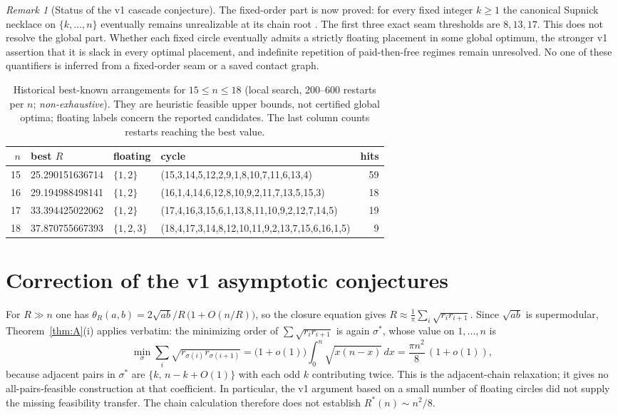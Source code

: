 \documentclass[11pt]{article}
\theoremstyle{definition}
\theoremstyle{remark}
\newtheorem{remark}[theorem]{Remark}
\begin{document}
\begin{remark}[Status of the v1 cascade conjecture]\label{conj:cascade}
The fixed-order part is now proved: for every fixed integer $k\ge1$ the canonical Supnick necklace on $\{k,\dots,n\}$ eventually remains unrealizable at its chain root \cite{fixedseams}. The first three exact seam thresholds are $8,13,17$. This does not resolve the global part. Whether each fixed circle eventually admits a strictly floating placement in some global optimum, the stronger v1 assertion that it is slack in every optimal placement, and indefinite repetition of paid-then-free regimes remain unresolved. No one of these quantifiers is inferred from a fixed-order seam or a saved contact graph.
\end{remark}

\begin{table}[ht]\centering
\caption{Historical best-known arrangements for $15\le n\le18$ (local search, 200--600 restarts per $n$; \emph{non-exhaustive}). They are heuristic feasible upper bounds, not certified global optima; floating labels concern the reported candidates. The last column counts restarts reaching the best value.}
\label{tab:heur}
\small
\begin{tabular}{rlllr}
\toprule
$n$ & best $R$ & floating & cycle & hits \\
\midrule
15 & 25.290151636714 & $\{1,2\}$ & (15,3,14,5,12,2,9,1,8,10,7,11,6,13,4) & 59 \\
16 & 29.194988498141 & $\{1,2\}$ & (16,1,4,14,6,12,8,10,9,2,11,7,13,5,15,3) & 18 \\
17 & 33.394425022062 & $\{1,2\}$ & (17,4,16,3,15,6,1,13,8,11,10,9,2,12,7,14,5) & 19 \\
18 & 37.870755667393 & $\{1,2,3\}$ & (18,4,17,3,14,8,12,10,11,9,2,13,7,15,6,16,1,5) & 9 \\
\bottomrule
\end{tabular}
\end{table}

\section{Correction of the v1 asymptotic conjectures}\label{sec:asymptotics}

For $R\gg n$ one has $\theta_R(a,b)=2\sqrt{ab}/R\,\big(1+O(n/R)\big)$, so the closure equation gives
$R\approx\frac1\pi\sum_i\sqrt{r_ir_{i+1}}$. Since $\sqrt{ab}$ is supermodular, Theorem~\ref{thm:A}(i) applies verbatim: the minimizing order of $\sum\sqrt{r_ir_{i+1}}$ is again $\sigma^\ast$, whose value on $1,\dots,n$ is
\[
\min_\sigma\sum_i\sqrt{r_{\sigma(i)}r_{\sigma(i+1)}}
=\Big(1+o(1)\Big)\int_0^n\sqrt{x(n-x)}\,dx=\frac{\pi n^2}{8}\,(1+o(1)),
\]
because adjacent pairs in $\sigma^\ast$ are $\{k,\,n-k+O(1)\}$ with each odd $k$ contributing twice. This is the adjacent-chain relaxation; it gives no all-pairs-feasible construction at that coefficient. In particular, the v1 argument based on a small number of floating circles did not supply the missing feasibility transfer. The chain calculation therefore does not establish $R^\ast(n)\sim n^2/8$.
\end{document}
